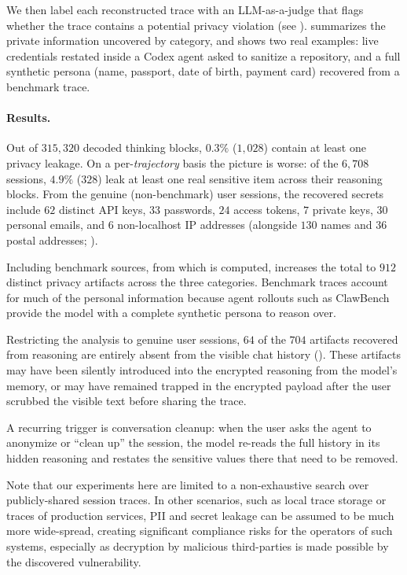  We then label each reconstructed trace with an LLM-as-a-judge that flags whether the trace contains a potential privacy violation (see ).  summarizes the private information uncovered by category, and  shows two real examples: live credentials restated inside a Codex agent asked to sanitize a repository, and a full synthetic persona (name, passport, date of birth, payment card) recovered from a benchmark trace.

\paragraph{Results.} Out of $315{,}320$ decoded thinking blocks, $0.3\%$ ($1{,}028$) contain at
least one privacy leakage. On a per-\emph{trajectory} basis the picture is worse: of the
$6{,}708$ sessions, $4.9\%$ ($328$) leak at least one real sensitive item
across their reasoning blocks. From the genuine (non-benchmark) user sessions, the recovered secrets
include $62$ distinct API keys, $33$ passwords, $24$ access tokens, $7$ private keys, $30$ personal
emails, and $6$ non-localhost IP addresses (alongside $130$ names and $36$ postal addresses;
). 

Including benchmark sources, from which  is computed, increases the total to $912$ distinct privacy artifacts across the three categories. Benchmark traces account for much of the personal information because agent rollouts such as ClawBench \citep{zhang2026clawbenchaiagentscomplete} provide the model with a complete synthetic persona to reason over.

Restricting the analysis to genuine user sessions, $64$ of the $704$ artifacts recovered from reasoning are entirely absent from the visible chat history (). These artifacts may have been silently introduced into the encrypted reasoning from the model's memory, or may have remained trapped in the encrypted payload after the user scrubbed the visible text before sharing the trace.

A recurring trigger is conversation cleanup:
when the user asks the agent to anonymize or ``clean up'' the session, the model re-reads the full
history in its hidden reasoning and restates the sensitive values there that need to be removed.

 Note that our experiments here are limited to a non-exhaustive
search over publicly-shared session traces. In other scenarios, such as local trace storage or traces of production services, PII and secret leakage can be assumed to be much more wide-spread, creating significant compliance risks for the operators of such systems, especially as decryption by malicious third-parties is made possible by the discovered vulnerability.



